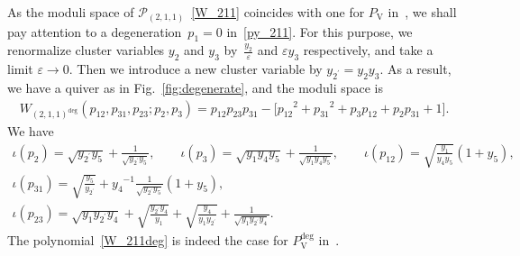 \documentclass[10pt,a4paper]{amsart}
\numberwithin{equation}{section}
\begin{document}
As the moduli space of $\mathcal{P}_{(2,1,1)}$~\eqref{W_211} coincides with one for $P_{\mathrm{V}}$ in~\cite{vdPutSaito09a}, we shall pay attention to a degeneration~$p_1=0$ in~\eqref{py_211}. For this purpose, we renormalize cluster variables $y_2$ and $y_3$ by~$\frac{y_2}{\varepsilon}$ and $\varepsilon y_3$ respectively, and take a limit $\varepsilon\to 0$. Then we introduce a new cluster variable by $y_{2^\prime}=y_2 y_3$. As a result, we have a quiver as in Fig.~\ref{fig:degenerate}, and the moduli space is
\begin{gather} \label{W_211deg}
 W_{(2,1,1)^{\text{deg}}}( p_{12}, p_{31}, p_{23} ; p_2, p_3) = p_{12} p_{23} p_{31} - \big[ {p_{12}}^2 + {p_{31}}^2 + p_3 p_{12} + p_2 p_{31} + 1 \big] .
\end{gather}
We have
\begin{gather}
 \iota(p_2) = \sqrt{ y_{2^\prime} y_5} + \frac{1}{\sqrt{y_{2^\prime} y_5}} , \qquad \iota(p_3) = \sqrt{y_1 y_4 y_5} + \frac{1}{\sqrt{y_1 y_4 y_5}} ,\qquad
 \iota(p_{12}) = \sqrt{\frac{y_1}{y_4 y_5}} ( 1 + y_5) , \nonumber\\
 \iota(p_{31}) = \sqrt{\frac{y_5}{y_{2^\prime}}} + {y_4}^{-1} \frac{1}{\sqrt{y_{2^\prime} y_5}} ( 1+y_5 ),\nonumber \\
 \iota(p_{23}) = \sqrt{y_1 y_{2^\prime} y_4} +\sqrt{\frac{y_{2^\prime} y_4}{y_1}} +\sqrt{\frac{y_4}{y_1 y_{2^\prime}}} +\frac{1}{\sqrt{y_1 y_{2^\prime} y_4 }} .\label{py_211deg}
\end{gather}
The polynomial~\eqref{W_211deg} is indeed the case for $P_{\mathrm{V}}^{\text{deg}}$ in~\cite{vdPutSaito09a}.
\end{document}

